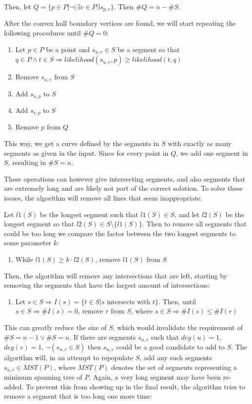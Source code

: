 \documentclass[11pt]{article}
\begin{document}
Then, let $Q = \{ p \in P | \neg ( \exists v \in P \exists s_{p,v} \}$. Then $\#Q = n - \#S$.

After the convex hull boundary vertices are found, we will start repeating the following procedures until $\#Q = 0$:

\begin{enumerate}
\item Let $p \in P$ be a point and $s_{u,v} \in S$ be a segment so that $q \in P \wedge t \in S \Rightarrow likelihood(s_{u,v}, p) \geq likelihood(t, q)$
\item Remove $s_{u,v}$ from $S$
\item Add $s_{u, p}$ to $S$
\item Add $s_{v, p}$ to $S$
\item Remove $p$ from $Q$
\end{enumerate}

This way, we get a curve defined by the segments in $S$ with exactly as many segments as given in the input. Since for every point in $Q$, we add one segment in $S$, resulting in $\#S = n$.

These operations can however give intersecting segments, and also segments that are extremely long and are likely not part of the correct solution. To solve these issues, the algorithm will remove all lines that seem inappropriate.

Let $l1(S)$ be the longest segment such that $l1(S) \in S$, and let $l2(S)$ be the longest segment so that $l2(S) \in S \setminus \{ l1(S) \}$. Then to remove all segments that could be too long we compare the factor between the two longest segments to some parameter $k$:

\begin{enumerate}
\item While $l1(S) \geq k \cdot l2(S)$, remove $l1(S)$ from $S$
\end{enumerate}

Then, the algorithm will remove any intersections that are left, starting by removing the segments that have the largest amount of intersections:

\begin{enumerate}
\item Let $s \in S \Rightarrow I(s) = \{ t \in S | s$ intersects with $t \}$. Then, until $s \in S \Rightarrow \#I(s) = 0$, remove $r$ from $S$, where $s \in S \Rightarrow \#I(s) \leq \#I(r)$
\end{enumerate}

This can greatly reduce the size of $S$, which would invalidate the requirement of $\#S = n-1 \vee \#S = n$. If there are segments $s_{u,v}$ such that $deg(u) = 1$, $deg(v) = 1$, $\neg ( s_{u,v} \in S )$ then $s_{u,v}$ could be a good candidate to add to $S$. The algorithm will, in an attempt to repopulate $S$, add any such segments $s_{u,v} \in MST(P) $, where $MST(P)$ denotes the set of segments representing a minimum spanning tree of $P$. Again, a very long segment may have been re-added. To prevent this from showing up in the final result, the algorithm tries to remove a segment that is too long one more time:
\end{document}

